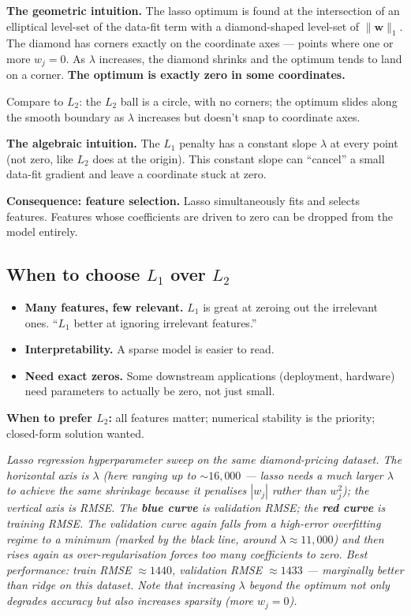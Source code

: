 \documentclass[11pt, a4paper]{article}
\begin{document}
\textbf{The geometric intuition.} The lasso optimum is found at the intersection of an elliptical level-set of the data-fit term with a diamond-shaped level-set of $\|\mathbf{w}\|_1$. The diamond has corners exactly on the coordinate axes — points where one or more $w_j = 0$. As $\lambda$ increases, the diamond shrinks and the optimum tends to land on a corner. \textbf{The optimum is exactly zero in some coordinates.}

Compare to $L_2$: the $L_2$ ball is a circle, with no corners; the optimum slides along the smooth boundary as $\lambda$ increases but doesn't snap to coordinate axes.

\textbf{The algebraic intuition.} The $L_1$ penalty has a constant slope $\lambda$ at every point (not zero, like $L_2$ does at the origin). This constant slope can ``cancel'' a small data-fit gradient and leave a coordinate stuck at zero.

\textbf{Consequence: feature selection.} Lasso simultaneously fits and selects features. Features whose coefficients are driven to zero can be dropped from the model entirely.

\subsection{When to choose $L_1$ over $L_2$}

\begin{itemize}
  \item \textbf{Many features, few relevant.} $L_1$ is great at zeroing out the irrelevant ones. ``$L_1$ better at ignoring irrelevant features.''
  \item \textbf{Interpretability.} A sparse model is easier to read.
  \item \textbf{Need exact zeros.} Some downstream applications (deployment, hardware) need parameters to actually be zero, not just small.
\end{itemize}

\textbf{When to prefer $L_2$:} all features matter; numerical stability is the priority; closed-form solution wanted.

\begin{center}

\footnotesize\textit{Lasso regression hyperparameter sweep on the same diamond-pricing dataset. The horizontal axis is $\lambda$ (here ranging up to $\sim 16{,}000$ --- lasso needs a much larger $\lambda$ to achieve the same shrinkage because it penalises $|w_j|$ rather than $w_j^2$); the vertical axis is RMSE. The \textbf{blue curve} is validation RMSE; the \textbf{red curve} is training RMSE. The validation curve again falls from a high-error overfitting regime to a minimum (marked by the black line, around $\lambda \approx 11{,}000$) and then rises again as over-regularisation forces too many coefficients to zero. Best performance: train RMSE $\approx 1440$, validation RMSE $\approx 1433$ --- marginally better than ridge on this dataset. Note that increasing $\lambda$ beyond the optimum not only degrades accuracy but also increases sparsity (more $w_j = 0$).}
\end{center}
\end{document}
